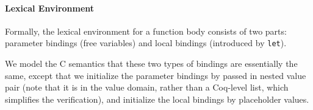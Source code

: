 \paragraph{Lexical Environment}\label{par:tyev}

Formally, the lexical environment for a function body consists of two parts:
parameter bindings (free variables) and local bindings (introduced by \texttt{let}).

We model the C semantics that these two types of bindings are essentially the same,
except that we initialize the parameter bindings by passed in nested value pair
(note that it is in the value domain, rather than a Coq-level list, which simplifies the verification),
and initialize the local bindings by placeholder values.
